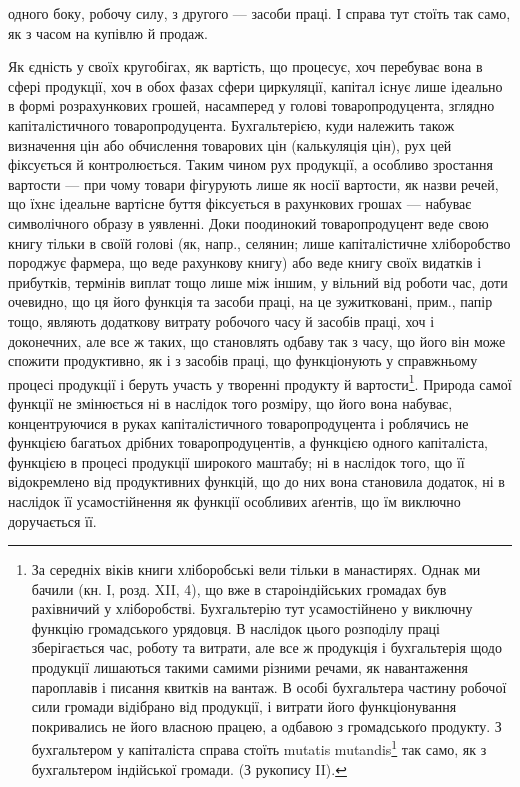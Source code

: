 \parcont{}  %
одного боку, робочу силу, з другого — засоби праці. І справа тут стоїть
так само, як з часом на купівлю й продаж.

Як єдність у своїх кругобігах, як вартість, що процесує, хоч перебуває
вона в сфері продукції, хоч в обох фазах сфери циркуляції, капітал
існує лише ідеально в формі розрахункових грошей, насамперед у голові
товаропродуцента, зглядно капіталістичного товаропродуцента. Бухгальтерією,
куди належить також визначення цін або обчислення товарових
цін (калькуляція цін), рух цей фіксується й контролюється. Таким
чином рух продукції, а особливо зростання вартости — при чому товари
фігурують лише як носії вартости, як назви речей, що їхнє ідеальне
вартісне буття фіксується в рахункових грошах — набуває символічного
образу в уявленні. Доки поодинокий товаропродуцент веде свою книгу
тільки в своїй голові (як, напр., селянин; лише капіталістичне хліборобство
породжує фармера, що веде рахункову книгу) або веде книгу своїх
видатків і прибутків, термінів виплат тощо лише між іншим, у вільний від
роботи час, доти очевидно, що ця його функція та засоби праці, на це
зужитковані, прим., папір тощо, являють додаткову витрату робочого часу
й засобів праці, хоч і доконечних, але все ж таких, що становлять одбаву
так з часу, що його він може спожити продуктивно, як і з засобів праці, що
функціонують у справжньому процесі продукції і беруть участь у творенні
продукту й вартости\footnote{
За середніх віків книги хліборобські вели тільки в манастирях. Однак ми
бачили (кн. І, розд. XII, 4), що вже в староіндійських громадах був рахівничий
у хліборобстві. Бухгальтерію тут усамостійнено у виключну функцію громадського урядовця. В наслідок
цього розподілу праці зберігається час, роботу та витрати, але все ж продукція і бухгальтерія щодо
продукції лишаються такими самими різними речами, як навантаження пароплавів і писання квитків на
вантаж. В особі бухгальтера частину робочої сили громади відібрано від продукції, і витрати його
функціонування покривались не його власною працею, а одбавою з громадськоґо
продукту. З бухгальтером у капіталіста справа стоїть mutatis mutandis\footnote*{
Змінивши те, що треба змінити, або з відповідними змінами. \emph{Ред.}
} так само, як з бухгальтером
індійської громади. (З рукопису II).
}. Природа самої функції не змінюється ні в наслідок
того розміру, що його вона набуває, концентруючися в руках капіталістичного
товаропродуцента і роблячись не функцією багатьох дрібних товаропродуцентів,
а функцією одного капіталіста, функцією в процесі продукції
широкого маштабу; ні в наслідок того, що її відокремлено від продуктивних
функцій, що до них вона становила додаток, ні в наслідок її усамостійнення
як функції особливих аґентів, що їм виключно доручається її.

